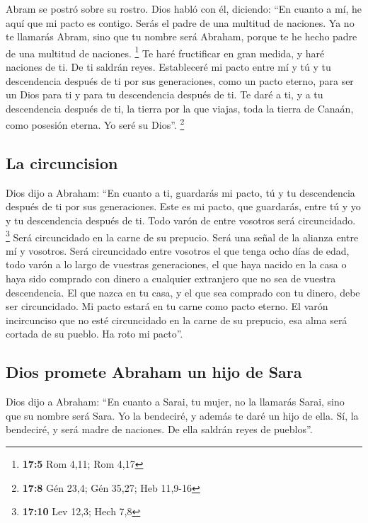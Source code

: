 \begin{paracol}{2}
 Abram se postró sobre su rostro. Dios habló con él,
diciendo:  ``En cuanto a mí, he aquí que mi pacto es
contigo. Serás el padre de una multitud de naciones.  Ya
no te llamarás Abram, sino que tu nombre será Abraham, porque te he
hecho padre de una multitud de naciones. \footnote{\textbf{17:5} Rom
  4,11; Rom 4,17}  Te haré fructificar en gran medida, y
haré naciones de ti. De ti saldrán reyes.  Estableceré mi
pacto entre mí y tú y tu descendencia después de ti por sus
generaciones, como un pacto eterno, para ser un Dios para ti y para tu
descendencia después de ti.  Te daré a ti, y a tu
descendencia después de ti, la tierra por la que viajas, toda la tierra
de Canaán, como posesión eterna. Yo seré su Dios''. \footnote{\textbf{17:8}
  Gén 23,4; Gén 35,27; Heb 11,9-16}

\hypertarget{la-circuncision}{%
\subsection{La circuncision}\label{la-circuncision}}

 Dios dijo a Abraham: ``En cuanto a ti, guardarás mi
pacto, tú y tu descendencia después de ti por sus generaciones.
 Este es mi pacto, que guardarás, entre tú y yo y tu
descendencia después de ti. Todo varón de entre vosotros será
circuncidado. \footnote{\textbf{17:10} Lev 12,3; Hech 7,8}
 Será circuncidado en la carne de su prepucio. Será una
señal de la alianza entre mí y vosotros.  Será
circuncidado entre vosotros el que tenga ocho días de edad, todo varón a
lo largo de vuestras generaciones, el que haya nacido en la casa o haya
sido comprado con dinero a cualquier extranjero que no sea de vuestra
descendencia.  El que nazca en tu casa, y el que sea
comprado con tu dinero, debe ser circuncidado. Mi pacto estará en tu
carne como pacto eterno.  El varón incircunciso que no
esté circuncidado en la carne de su prepucio, esa alma será cortada de
su pueblo. Ha roto mi pacto''.

\hypertarget{dios-promete-abraham-un-hijo-de-sara}{%
\subsection{Dios promete Abraham un hijo de
Sara}\label{dios-promete-abraham-un-hijo-de-sara}}

 Dios dijo a Abraham: ``En cuanto a Sarai, tu mujer, no
la llamarás Sarai, sino que su nombre será Sara.  Yo la
bendeciré, y además te daré un hijo de ella. Sí, la bendeciré, y será
madre de naciones. De ella saldrán reyes de pueblos''.


\end{paracol}
